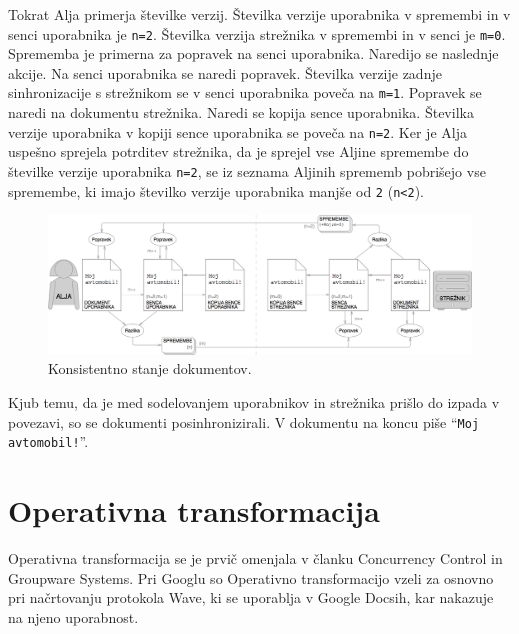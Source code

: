 \documentclass[a4paper, 12pt, twoside]{book}
\begin{document}
Tokrat Alja primerja številke verzij. Številka verzije uporabnika v spremembi in v senci uporabnika je {\tt n=2}. Številka verzija strežnika v spremembi in v senci je {\tt m=0}. Sprememba je primerna za popravek na senci uporabnika. Naredijo se naslednje akcije. Na senci uporabnika se naredi popravek. Številka verzije zadnje sinhronizacije s strežnikom se v senci uporabnika poveča na {\tt m=1}. Popravek se naredi na dokumentu strežnika. Naredi se kopija sence uporabnika. Številka verzije uporabnika v kopiji sence uporabnika se poveča na {\tt n=2}. Ker je Alja uspešno sprejela potrditev strežnika, da je sprejel vse Aljine spremembe do številke verzije uporabnika {\tt n=2}, se iz seznama Aljinih sprememb pobrišejo vse spremembe, ki imajo številko verzije uporabnika manjše od {\tt 2} ({\tt n<2}).

\begin{figure}[placement h]
\begin{center}
\includegraphics[width=16cm]{ds10.png}
\end{center}
\caption{Konsistentno stanje dokumentov.}
\label{ds10}
\end{figure}

Kjub temu, da je med sodelovanjem uporabnikov in strežnika prišlo do izpada v povezavi, so se dokumenti posinhronizirali. V dokumentu na koncu piše “{\tt Moj avtomobil!}”.

\section{Operativna transformacija}

Operativna transformacija se je prvič omenjala v članku Concurrency Control in Groupware Systems. Pri Googlu so Operativno transformacijo vzeli za osnovno pri načrtovanju protokola Wave, ki se uporablja v Google Docsih, kar nakazuje na njeno uporabnost.
\end{document}
